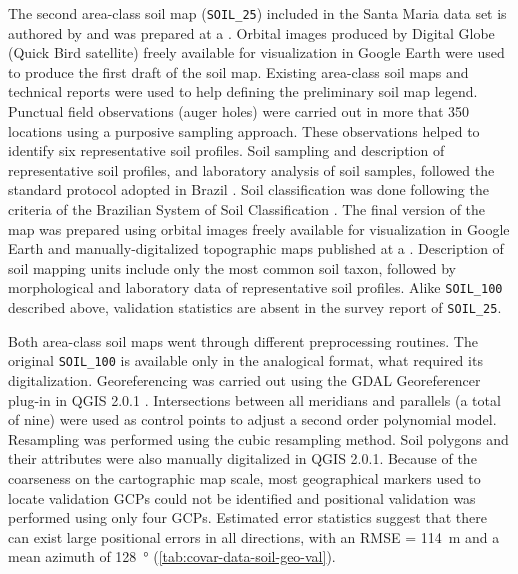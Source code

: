 The second area-class soil map (\texttt{SOIL\_25}) included in the Santa Maria data set is 
authored by \cite{Miguel2010} and was prepared at a . Orbital images produced by 
Digital Globe\textregistered{} (Quick Bird satellite) freely available for visualization in Google 
Earth\textregistered{} were used to produce the first draft of the soil map. Existing area-class 
soil maps and technical reports \cite{Pedron2005,Poelking2007,Sturmer2008} were used to help 
defining the preliminary soil map legend. Punctual field observations (auger holes) were carried 
out in more that \num{350} locations using a purposive sampling approach. These observations helped 
to identify six representative soil profiles. Soil sampling and description of representative soil 
profiles, and laboratory analysis of soil samples, followed the standard protocol adopted in Brazil 
\cite{ClaessenEtAl1997,SantosEtAl2005}. Soil classification was done following the criteria of the 
Brazilian System of Soil Classification \cite{SantosEtAl2006}. The final version of the map was 
prepared using orbital images freely available for visualization in Google Earth\textregistered{} 
and manually-digitalized topographic maps published at a  \cite{DSG1992a,DSG1992}. 
Description of soil mapping units include only the most common soil taxon, followed by morphological 
and laboratory data of representative soil profiles. Alike \texttt{SOIL\_100} described above, 
validation statistics are absent in the survey report of \texttt{SOIL\_25}.

Both area-class soil maps went through different preprocessing routines. The original 
\texttt{SOIL\_100} is available only in the analogical format, what required its digitalization.
Georeferencing was carried out using the GDAL Georeferencer plug-in in QGIS 2.0.1
\cite{GDAL2013,QGIS2013}. Intersections between all meridians and parallels (a total of nine) were 
used as control points to adjust a second order polynomial model. Resampling was performed using the 
cubic resampling method. Soil polygons and their attributes were also manually digitalized in QGIS 
2.0.1. Because of the coarseness on the cartographic map scale, most geographical markers used to 
locate validation GCPs could not be identified and positional validation was performed using only 
four GCPs. Estimated error statistics suggest that there can exist large positional errors in all 
directions, with an \SI{RMSE = 114}{\metre} and a mean azimuth of \SI{128}{\degree} 
(\autoref{tab:covar-data-soil-geo-val}).

